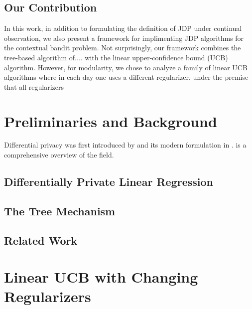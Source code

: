 \documentclass{article}
\begin{document}
\subsection{Our Contribution}
\label{sec:contributions}

In this work, in addition to formulating the definition of JDP under continual observation, we also present a framework for implimenting JDP algorithms for the contextual bandit problem. Not surprisingly, our framework combines the tree-based algorithm of.... with the linear upper-confidence bound (UCB) algorithm. However, for modularity, we chose to analyze a family of linear UCB algorithms where in each day one uses a different regularizer, under the premise that all regularizers 



\section{Preliminaries and Background}
\label{sec:background}

Differential privacy was first introduced by
\citet{DworkCalibratingNoiseSensitivity2006} and its modern
formulation in \citet{DworkDifferentialPrivacy2006}.
 is a comprehensive
overview of the field.





\subsection{Differentially Private Linear Regression}
\label{sec:dp-regression}

\subsection{The Tree Mechanism}
\label{sec:tree-mechanism}

\subsection{Related Work}
\label{sec:related-work}


\section{Linear UCB with Changing Regularizers}
\end{document}
